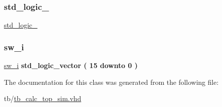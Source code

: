 \mbox{\label{classtb__calc__top_1_1sim_acd03516902501cd1c7296a98e22c6fcb}} 
\subsubsection{\texorpdfstring{std\+\_\+logic\+\_}{std\_logic\_1164}}
{\footnotesize\ttfamily \hyperlink{classtb__calc__top_1_1sim_acd03516902501cd1c7296a98e22c6fcb}{std\+\_\+logic\+\_}\hspace{0.3cm}{\ttfamily [Package]}}

\mbox{\label{classtb__calc__top_1_1sim_a0b9dc2012189ff08c5be99a0b802e7bb}} 
\subsubsection{\texorpdfstring{sw\+\_\+i}{sw\_i}}
{\footnotesize\ttfamily \hyperlink{classtb__calc__top_1_1sim_a0b9dc2012189ff08c5be99a0b802e7bb}{sw\+\_\+i} {\bfseries \textcolor{comment}{std\+\_\+logic\+\_\+vector}\textcolor{vhdlchar}{ }\textcolor{vhdlchar}{(}\textcolor{vhdlchar}{ }\textcolor{vhdlchar}{ } \textcolor{vhdldigit}{15} \textcolor{vhdlchar}{ }\textcolor{keywordflow}{downto}\textcolor{vhdlchar}{ }\textcolor{vhdlchar}{ } \textcolor{vhdldigit}{0} \textcolor{vhdlchar}{ }\textcolor{vhdlchar}{)}\textcolor{vhdlchar}{ }} \hspace{0.3cm}{\ttfamily [Signal]}}



The documentation for this class was generated from the following file\+:\begin{DoxyCompactItemize}
\item 
tb/\hyperlink{tb__calc__top__sim_8vhd}{tb\+\_\+calc\+\_\+top\+\_\+sim.\+vhd}\end{DoxyCompactItemize}
